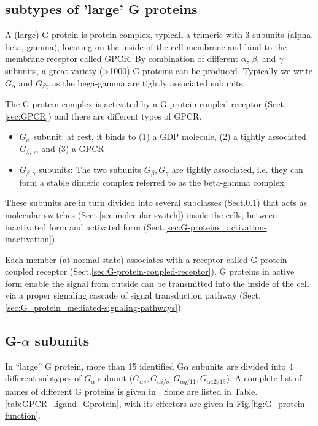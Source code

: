\subsection{subtypes of 'large' G proteins}
\label{sec:G-protein_subtypes}

A (large) G-protein is protein complex, typicall a trimeric with 3 subunits
(alpha, beta, gamma), locating on the inside of the cell membrane and bind to
the membrane receptor called GPCR. By combination of different $\alpha$,
$\beta$, and $\gamma$ subunits, a great variety (>1000) G proteins can be produced.
Typically we write $G_\alpha$ and $G_{\beta\gamma}$ as the bega-gamma are
tightly associated subunits.

The G-protein complex is activated by a G protein-coupled receptor
(Sect.\ref{sec:GPCR}) and there are different types of GPCR.
\begin{itemize}
  \item $G_\alpha$ subunit: at rest, it binds to (1) a GDP molecule, (2) a
  tightly associated $G_{\beta,\gamma}$, and (3) a GPCR
  
  \item $G_{\beta,\gamma}$ subunits: The two subunits $G_\beta, G_\gamma$ are
  tightly associated, i.e. they can form a stable dimeric complex referred to as
  the beta-gamma complex. 

\end{itemize}
These subunits are in turn divided into several subclasses
(Sect.\ref{sec:G-protein_subtypes}) that acts as molecular switches
(Sect.\ref{sec:molecular-switch}) inside the cells, between inactivated form and
activated form (Sect.\ref{sec:G-proteins_activation-inactivation}).

Each member (at normal state) associates with a  receptor called G
protein-coupled receptor (Sect.\ref{sec:G-protein-coupled-receptor}).
G proteins in active form enable the signal from outside can be transmitted into
the inside of the cell via a proper signaling cascade of signal transduction
pathway (Sect.\ref{sec:G_protein_mediated-signaling-pathways}).


\subsection{\texorpdfstring{G-$\alpha$ subunits}{G-alpha subunits}}
\label{sec:G_alpha-subunits}

In ``large'' G protein, more than 15 identified G$\alpha$ subunits are divided
into 4 different subtypes of $G_\alpha$ subunit ($G_{\alpha s}, G_{\alpha i/o},
G_{\alpha q/11}, G_{\alpha 12/13}$).
A complete list of names of different G proteins is given in
\citep{Wettschureck2005}.
Some are listed in Table. \ref{tab:GPCR_ligand_Gprotein}, with its effectors are
given in Fig.\ref{fig:G_protein-function}.
	

